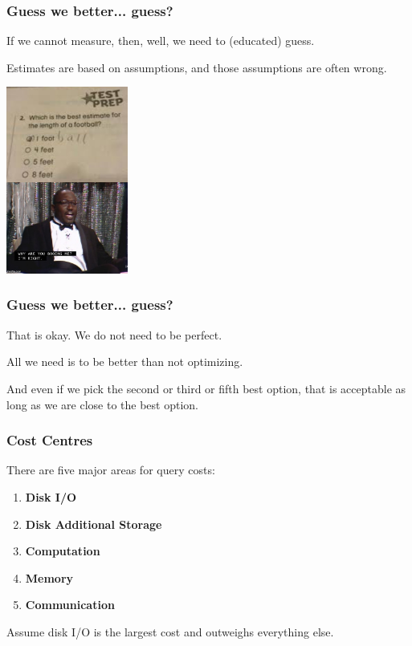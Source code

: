 \begin{frame}
\frametitle{Guess we better... guess?}

If we cannot measure, then, well, we need to (educated) guess. 

Estimates are based on assumptions, and those assumptions are often wrong. 

\begin{center}
	\includegraphics[width=0.3\textwidth]{images/football.jpeg}
\end{center}

\end{frame}


\begin{frame}
\frametitle{Guess we better... guess?}

That is okay. We do not need to be perfect. 

All we need is to be better than not optimizing.

And even if we pick the second or third or fifth best option, that is acceptable as long as we are close to the best option.


\end{frame}

\begin{frame}
\frametitle{Cost Centres}

There are five major areas for query costs:

\begin{enumerate}
	\item \textbf{Disk I/O}
	\item \textbf{Disk Additional Storage}
	\item \textbf{Computation}
	\item \textbf{Memory}
	\item \textbf{Communication}
\end{enumerate}

Assume disk I/O is the largest cost and outweighs everything else.

\end{frame}


